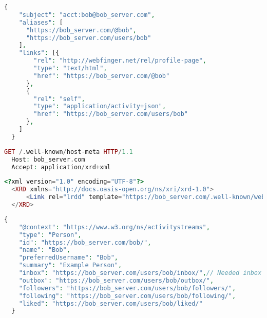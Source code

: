 \lstset{style=JSONStyle}
\begin{lstlisting}[language=PHP, caption=Webfinger response from \emph{bob\_server.com}, label=fig:webfinger_response, float=h]
  {
    "subject": "acct:bob@bob_server.com",
    "aliases": [
      "https://bob_server.com/@bob",
      "https://bob_server.com/users/bob"
    ],
    "links": [{
        "rel": "http://webfinger.net/rel/profile-page",
        "type": "text/html",
        "href": "https://bob_server.com/@bob"
      },
      {
        "rel": "self",
        "type": "application/activity+json",
        "href": "https://bob_server.com/users/bob"
      },
    ]
  }
\end{lstlisting}

\pagebreak

\begin{lstlisting}[language=PHP, caption=Host-Meta request to \emph{bob\_server.com}, label=fig:hostmeta_request, float=h]
  GET /.well-known/host-meta HTTP/1.1
  Host: bob_server.com
  Accept: application/xrd+xml
\end{lstlisting}

\lstset{style=JSONStyle}
\begin{lstlisting}[language=PHP,caption=Host-Meta response from \emph{bob\_server.com}, label=fig:hostmeta_response, float=h]
  <?xml version="1.0" encoding="UTF-8"?>
  <XRD xmlns="http://docs.oasis-open.org/ns/xri/xrd-1.0">
      <Link rel="lrdd" template="https://bob_server.com/.well-known/webfinger?resource={uri}"/>
  </XRD>
\end{lstlisting} 

\lstset{style=JSONStyle}
\begin{lstlisting}[language=PHP, caption=Bob's actor object, label=fig:bob_object, float=h!]
  {
    "@context": "https://www.w3.org/ns/activitystreams",
    "type": "Person",
    "id": "https://bob_server.com/bob/",
    "name": "Bob",
    "preferredUsername": "Bob",
    "summary": "Example Person",
    "inbox": "https://bob_server.com/users/bob/inbox/",// Needed inbox URL
    "outbox": "https://bob_server.com/users/bob/outbox/",
    "followers": "https://bob_server.com/users/bob/followers/",
    "following": "https://bob_server.com/users/bob/following/",
    "liked": "https://bob_server.com/users/bob/liked/"
  }
\end{lstlisting}

